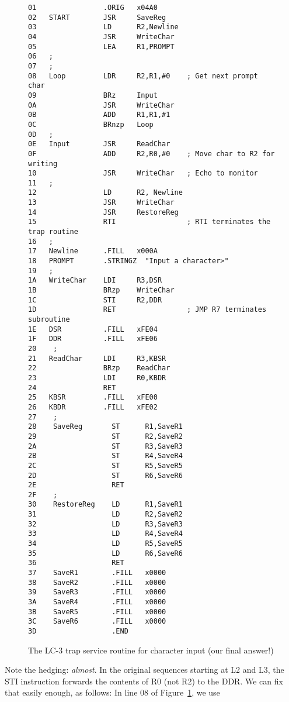 \documentclass{patt}
\begin{document}
\begin{figure}[h!]
\begin{Verbatim}[fontsize=\fontsize{8}{9}\selectfont]
01                .ORIG   x04A0
02   START        JSR     SaveReg
03                LD      R2,Newline
04                JSR     WriteChar
05                LEA     R1,PROMPT
06   ;
07   ;
08   Loop         LDR     R2,R1,#0    ; Get next prompt char
09                BRz     Input
0A                JSR     WriteChar
0B                ADD     R1,R1,#1
0C                BRnzp   Loop
0D   ;
0E   Input        JSR     ReadChar
0F                ADD     R2,R0,#0    ; Move char to R2 for writing
10                JSR     WriteChar   ; Echo to monitor
11   ;
12                LD      R2, Newline
13                JSR     WriteChar
14                JSR     RestoreReg
15                RTI                 ; RTI terminates the trap routine
16   ;                                  
17   Newline      .FILL   x000A
18   PROMPT       .STRINGZ  "Input a character>"
19   ;
1A   WriteChar    LDI     R3,DSR
1B                BRzp    WriteChar
1C                STI     R2,DDR
1D                RET                 ; JMP R7 terminates subroutine
1E   DSR          .FILL   xFE04
1F   DDR          .FILL   xFE06
20    ;
21   ReadChar     LDI     R3,KBSR
22                BRzp    ReadChar
23                LDI     R0,KBDR
24                RET
25   KBSR         .FILL   xFE00
26   KBDR         .FILL   xFE02
27    ;
28    SaveReg       ST      R1,SaveR1
29                  ST      R2,SaveR2
2A                  ST      R3,SaveR3
2B                  ST      R4,SaveR4
2C                  ST      R5,SaveR5
2D                  ST      R6,SaveR6
2E                  RET
2F    ;
30    RestoreReg    LD      R1,SaveR1
31                  LD      R2,SaveR2
32                  LD      R3,SaveR3
33                  LD      R4,SaveR4
34                  LD      R5,SaveR5
35                  LD      R6,SaveR6
36                  RET
37    SaveR1        .FILL   x0000
38    SaveR2        .FILL   x0000
39    SaveR3        .FILL   x0000
3A    SaveR4        .FILL   x0000
3B    SaveR5        .FILL   x0000
3C    SaveR6        .FILL   x0000
3D                  .END
\end{Verbatim}
\caption{The LC-3 trap service routine for character input (our final answer!)}
\label{fig:char.input.revisited}
\end{figure}

Note the hedging: {\em almost}. In the original sequences starting at
L2 and L3, the STI instruction forwards the contents of R0 (not R2) to
the DDR.  We can fix that easily enough, as follows: In line 08 of
Figure~\ref{fig:char.input.revisited}, we use
\end{document}
